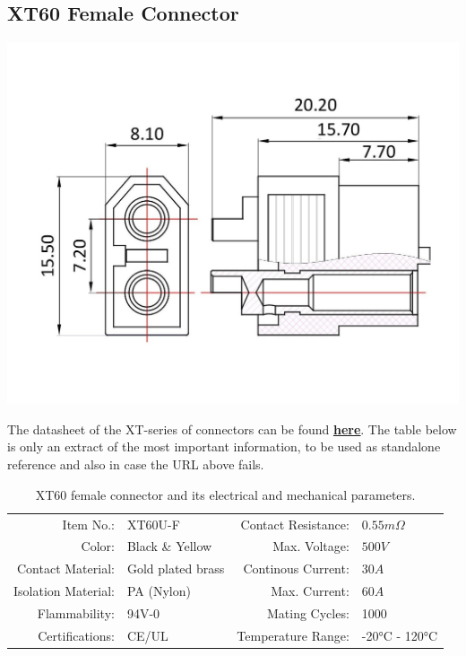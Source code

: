 \clearpage %

\subsection{XT60 Female Connector}

\includegraphics[width=\textwidth]{contents/figures/xt60_f.jpg}

The datasheet of the XT-series of connectors can be found \href{https://www.lcsc.com/datasheet/lcsc_datasheet_2401031338_Changzhou-Amass-Elec-XT60U-F_C19191801.pdf}{\textbf{\underline{here}}}.
The table below is only an extract of the most important information, to be used as standalone reference and also in case the URL above fails.

\begin{table}[h] %
    \begin{tabular}{rlrl}
         Item No.:&  XT60U-F &  Contact Resistance:& $0.55m \Omega$\\
         Color:&  Black \& Yellow&  Max. Voltage:& $500V$\\
         Contact Material:&  Gold plated brass&  Continous Current:& $30A$\\
         Isolation Material:&  PA (Nylon)&  Max. Current:& $60A$\\
         Flammability:&  94V-0&  Mating Cycles:& 1000\\
         Certifications:&  CE/UL&  Temperature Range:& -20°C - 120°C\\
    \end{tabular}
    \caption{XT60 female connector and its electrical and mechanical parameters.}
    \label{xt60_f_specs}
\end{table}

